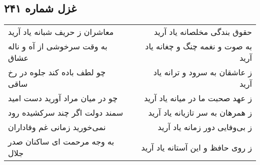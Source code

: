\begin{center}
\section*{غزل شماره ۲۴۱}
\label{sec:sh241}
\begin{longtable}{l p{0.5cm} r}
معاشران ز حریف شبانه یاد آرید
&&
حقوق بندگی مخلصانه یاد آرید
\\
به وقت سرخوشی از آه و ناله عشاق
&&
به صوت و نغمه چنگ و چغانه یاد آرید
\\
چو لطف باده کند جلوه در رخ ساقی
&&
ز عاشقان به سرود و ترانه یاد آرید
\\
چو در میان مراد آورید دست امید
&&
ز عهد صحبت ما در میانه یاد آرید
\\
سمند دولت اگر چند سرکشیده رود
&&
ز همرهان به سر تازیانه یاد آرید
\\
نمی‌خورید زمانی غم وفاداران
&&
ز بی‌وفایی دور زمانه یاد آرید
\\
به وجه مرحمت ای ساکنان صدر جلال
&&
ز روی حافظ و این آستانه یاد آرید
\\
\end{longtable}
\end{center}
